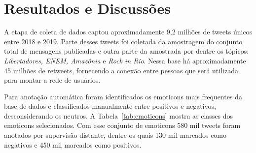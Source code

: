 \chapter{Resultados e Discussões}
\label{chapter:results}


A etapa de coleta de dados captou aproximadamente 9,2 milhões de tweets únicos
entre 2018 e 2019.
Parte desses tweets foi coletada da amostragem do conjunto total de mensagens
publicadas e outra parte da amostrada por dentre os tópicos: \textit{Libertadores,
ENEM, Amazônia} e \textit{Rock in Rio}.
Nessa base há aproximadamente 45 milhões de retweets, fornecendo a conexão entre
pessoas que será utilizada para montar a rede de usuários.

Para anotação automática foram identificados os emoticons mais frequentes da
base de dados e classificados manualmente entre positivos e negativos,
desconsiderando os neutros.
A Tabela~\ref{tab:emoticons} mostra as classes dos emoticons selecionados.
Com esse conjunto de emoticons 580 mil tweets foram anotados por supervisão
distante, dentre os quais 130 mil marcados como negativos e 450 mil marcados como
positivos.

